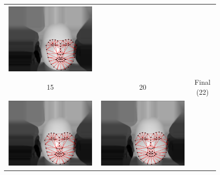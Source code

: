 \begin{figure}
{\begin{tabular}{ccc}
    \includegraphics[valign=m,scale=0.16]{statistical_normals/images/lk2d/fitting/fitting_10} \\
    15 & 20 & Final (22) \\
    \includegraphics[valign=m,scale=0.16]{statistical_normals/images/lk2d/fitting/fitting_15} &
    \includegraphics[valign=m,scale=0.16]{statistical_normals/images/lk2d/fitting/fitting_20} &

\end{tabular}}
\end{figure}
